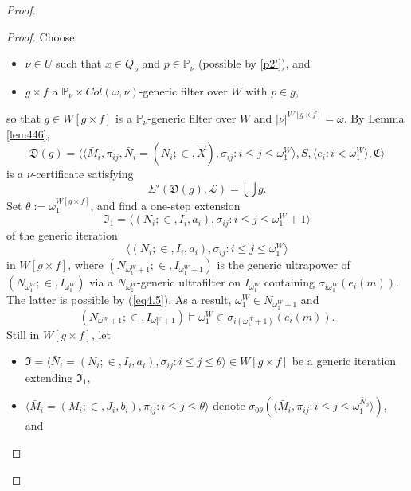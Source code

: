 \documentclass[12pt, twoside]{memoir}
\numberwithin{equation}{section}
\theoremstyle{definition}
\theoremstyle{remark}
\theoremstyle{definition}
\theoremstyle{definition}
\theoremstyle{definition}
\theoremstyle{remark}
\begin{document}
\begin{proof}
\begin{proof}
Choose 
\begin{itemize}
    \item $\nu \in U$ such that $x \in Q_{\nu}$ and $p \in \mathbb{P}_{\nu}$ (possible by \ref{p2'}), and
    \item $g \times f$ a $\mathbb{P}_{\nu} \times Col(\omega, \nu)$-generic filter over $W$ with $p \in g$,
\end{itemize}
so that $g \in W[g \times f]$ is a $\mathbb{P}_{\nu}$-generic filter over $W$ and $|\nu|^{W[g \times f]} = \omega$. By Lemma \ref{lem446}, 
\begin{equation*}
    \mathfrak{D}(g) = \langle \langle \bar{M}_i, \pi_{ij}, \bar{N}_i = (N_i; \in, \Vec{X}), \sigma_{ij} : i \leq j \leq \omega_1^{W} \rangle, S, \langle e_i : i < \omega_1^W \rangle, \mathfrak{C} \rangle
\end{equation*}
is a $\nu$-certificate satisfying
\begin{equation*}
    \Sigma'(\mathfrak{D}(g), \mathcal{L}) = \bigcup g \text{.}
\end{equation*}
Set $\theta := \omega_1^{W[g \times f]}$, and find a one-step extension 
\begin{equation*}
    \mathfrak{I}_1 = \langle (N_i; \in, I_i, a_i), \sigma_{ij} : i \leq j \leq \omega_1^{W} + 1 \rangle
\end{equation*}  
of the generic iteration 
\begin{equation*}
    \langle (N_i; \in, I_i, a_i), \sigma_{ij} : i \leq j \leq \omega_1^{W} \rangle
\end{equation*}
in $W[g \times f]$, where $(N_{\omega_1^W + 1}; \in, I_{\omega_1^W + 1})$ is the generic ultrapower of $(N_{\omega_1^W}; \in, I_{\omega_1^W})$ via a $N_{\omega_1^W}$-generic ultrafilter on $I_{\omega_1^W}$ containing $\sigma_{i\omega_1^W}(e_i(m))$. The latter is possible by (\ref{eq4.5}). As a result, $\omega_1^W \in N_{\omega_1^W + 1}$ and
\begin{equation}\label{eq4.6}
    (N_{\omega_1^W + 1}; \in, I_{\omega_1^W + 1}) \models \omega_1^W \in \sigma_{i(\omega_1^W + 1)}(e_i(m)) \text{.}
\end{equation}
Still in $W[g \times f]$, let 
\begin{itemize}
    \item $\mathfrak{I} = \langle \bar{N}_i = (N_i; \in, I_i, a_i), \sigma_{ij} : i \leq j \leq \theta \rangle \in W[g \times f]$ be a generic iteration extending $\mathfrak{I}_1$,
    \item $\langle \bar{M}_i = (M_i; \in, J_i, b_i), \pi_{ij} : i \leq j \leq \theta \rangle$ denote $\sigma_{0\theta}(\langle \bar{M}_i, \pi_{ij} : i \leq j \leq \omega_1^{\bar{N}_0} \rangle)$, and

\end{itemize}
\end{proof}
\end{proof}
\end{document}
